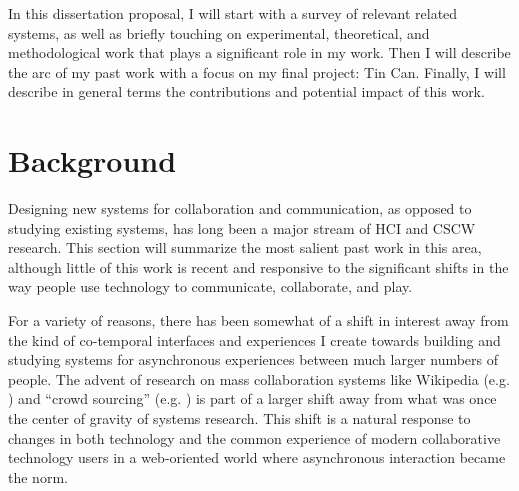\documentclass{tufte-handout}
\begin{document}


In this dissertation proposal, I will start with a survey of relevant related systems, as well as briefly touching on experimental, theoretical, and methodological work that plays a significant role in my work. Then I will describe the arc of my past work with a focus on my final project: Tin Can. Finally, I will describe in general terms the contributions and potential impact of this work.



\section{Background}

Designing new systems for collaboration and communication, as opposed to studying existing systems, has long been a major stream of HCI and CSCW research. This section will summarize the most salient past work in this area, although little of this work is recent and responsive to the significant shifts in the way people use technology to communicate, collaborate, and play. 

For a variety of reasons, there has been somewhat of a shift in interest away from the kind of co-temporal interfaces and experiences I create towards building and studying systems for asynchronous experiences between much larger numbers of people. The advent of research on mass collaboration systems like Wikipedia (e.g. \citep{Kittur:2007up}) and ``crowd sourcing'' (e.g. \citep{Bernstein:2010wk}) is part of a larger shift away from what was once the center of gravity of systems research. This shift is a natural response to changes in both technology and the common experience of modern collaborative technology users in a web-oriented world where asynchronous interaction became the norm.
\end{document}

